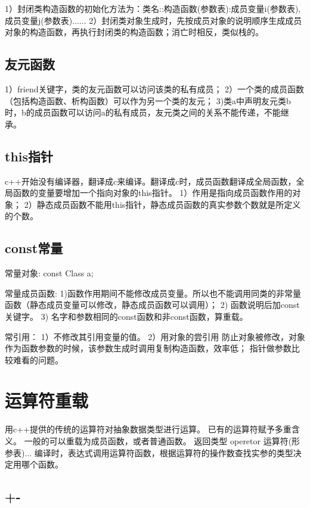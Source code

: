 \documentclass[UTF8]{article}
\begin{document}
1）封闭类构造函数的初始化方法为：类名::构造函数(参数表):成员变量i(参数表),成员变量j(参数表)...{...}
2）封闭类对象生成时，先按成员对象的说明顺序生成成员对象的构造函数，再执行封闭类的构造函数；消亡时相反，类似栈的。


\subsection{友元函数}
1）friend关键字，类的友元函数可以访问该类的私有成员；
2）一个类的成员函数（包括构造函数、析构函数）可以作为另一个类的友元；
3)类a中声明友元类b时，b的成员函数可以访问a的私有成员，友元类之间的关系不能传递，不能继承。


\subsection{this指针}
c++开始没有编译器，翻译成c来编译。翻译成c时，成员函数翻译成全局函数，全局函数的变量要增加一个指向对象的this指针。
1）作用是指向成员函数作用的对象；
2）静态成员函数不能用this指针，静态成员函数的真实参数个数就是所定义的个数。

\subsection{const常量}
常量对象: const Class a;


常量成员函数:
1)函数作用期间不能修改成员变量。所以也不能调用同类的非常量函数（静态成员变量可以修改，静态成员函数可以调用）；
2) 函数说明后加const关键字。
3) 名字和参数相同的const函数和非const函数，算重载。

常引用：
1）不修改其引用变量的值。
2）用对象的尝引用 %
防止对象被修改，对象作为函数参数的时候，该参数生成时调用复制构造函数，效率低； 指针做参数比较难看的问题。


\section{运算符重载}
用c++提供的传统的运算符对抽象数据类型进行运算。
已有的运算符赋予多重含义。
一般的可以重载为成员函数，或者普通函数。
返回类型 operetor 运算符(形参表){...}
编译时，表达式调用运算符函数，根据运算符的操作数查找实参的类型决定用哪个函数。

\subsection{+-}
\end{document}
